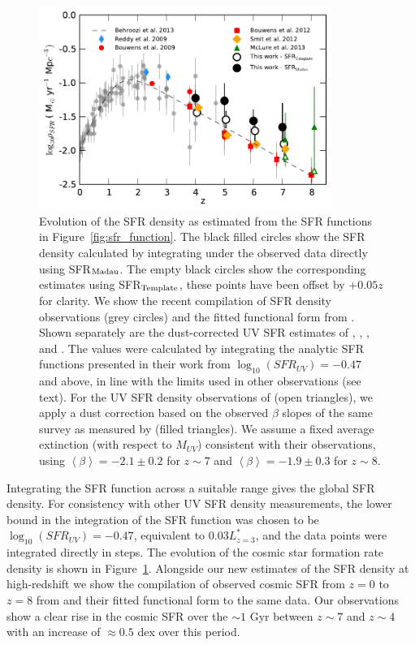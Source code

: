 \begin{figure}
\centering
\includegraphics[width=0.85\textwidth]{plots/fig15.pdf}
\caption[Evolution of the SFR density as estimated from the SFR functions in Figure~\ref{fig:sfr_function}.]{Evolution of the SFR density as estimated from the SFR functions in Figure~\ref{fig:sfr_function}. The black filled circles show the SFR density calculated by integrating under the observed data directly using SFR$_{\rm{Madau}}$. The empty black circles show the corresponding estimates using SFR$_{\rm{Template}}$, these points have been offset by $+0.05 z$ for clarity. We show the recent compilation of SFR density observations (grey circles) and the fitted functional form from \citet{Behroozi:2013fg}. Shown separately are the dust-corrected UV SFR estimates of \citet{Anonymous:r_woy2UF}, \citet{Bouwens:2009ik}, \citet{2012ApJ...754...83B},  \citet{Smit:2012is} and \citet{McLure:2013hh}. The \citet{Smit:2012is} values were calculated by integrating the analytic SFR functions presented in their work from $\log_{10}(SFR_{UV}) = -0.47$ and above, in line with the limits used in other observations (see text). For the UV SFR density observations of \citet{McLure:2013hh} (open triangles), we apply a dust correction based on the observed $\beta$ slopes of the same survey as measured by \citet{Dunlop:2013kp} (filled triangles). We assume a fixed average extinction (with respect to $M_{UV}$) consistent with their observations, using $\left \langle \beta \right \rangle = -2.1 \pm 0.2$ for $z \sim 7$ and $\left \langle \beta \right \rangle = -1.9 \pm 0.3$ for $z \sim 8$.}
\label{fig:sfr_density}
\end{figure}

Integrating the SFR function across a suitable range gives the global SFR density. For consistency with other UV SFR density measurements, the lower bound in the integration of the SFR function was chosen to be $\log_{10}(SFR_{UV}) = -0.47$, equivalent to $0.03 L^{*}_{z=3}$, and the data points were integrated directly in steps. The evolution of the cosmic star formation rate density is shown in Figure~\ref{fig:sfr_density}. Alongside our new estimates of the SFR density at high-redshift we show the compilation of observed cosmic SFR from $z=0$ to $z=8$ from \citet{Behroozi:2013fg} and their fitted functional form to the same data. Our observations show a clear rise in the cosmic SFR over the $\sim 1$ Gyr between $z\sim7$ and $z\sim4$ with an increase of $\approx 0.5$ dex over this period.

